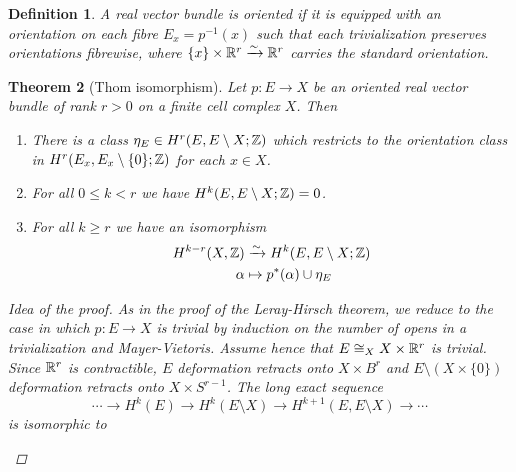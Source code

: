 \documentclass[A4paper, british, reqno]{amsart}
\theoremstyle{darkgreentheorem}
\newtheorem{thm}{Theorem}[section]
\theoremstyle{darkbluedefinition}
\newtheorem{defn}[thm]{Definition}
\theoremstyle{darkredexample}
\theoremstyle{remark}
\newcommand{\1}{\mathbbm{1}}
\newcommand{\ot}{\otimes}
\newcommand{\op}{\oplus}
\newcommand{\tms}{\times}
\begin{document}
\begin{defn}
    A real vector bundle is \textit{oriented} if it is equipped with an orientation on each fibre $E_{x}=p^{-1}(x)$ such that each trivialization preserves orientations fibrewise, where $\{x\}\times \mathbb{R}^{r}\xrightarrow{\sim}\mathbb{R}^{r}$ carries the standard orientation.
\end{defn}

\begin{thm}[Thom isomorphism]
    Let $p\colon E\to X$ be an oriented real vector bundle of rank $r>0$ on a finite cell complex $X$.
    Then
    \begin{enumerate}
	\item There is a class $\eta_{E}\in H^{r}(E,E\setminus X;\mathbb{Z})$ which restricts to the orientation class in $H^{r}(E_{x},E_{x}\setminus \{0\};\mathbb{Z})$ for each $x\in X$.
	\item For all $0\leqslant k<r$ we have $H^{k}(E,E\setminus X;\mathbb{Z})=0$.
	\item For all $k\geqslant r$ we have an isomorphism
	    \begin{align*}
		H^{k-r}(X,\mathbb{Z}) & \xrightarrow{\sim} H^{k}(E,E\setminus X;\mathbb{Z}) \\
		\alpha & \mapsto p^{*}(\alpha)\cup \eta_{E}
	    \end{align*}
    \end{enumerate}
    \begin{proof}[Idea of the proof]
	As in the proof of the Leray-Hirsch theorem, we reduce to the case in which $p\colon E\to X$ is trivial by induction on the number of opens in a trivialization and Mayer-Vietoris.
	Assume hence that $E\cong_{X} X\times \mathbb{R}^{r}$ is trivial.
	Since $\mathbb{R}^{r}$ is contractible, $E$ deformation retracts onto $X\times B^{r}$ and $E\setminus (X\times \{ 0\})$ deformation retracts onto $X\times S^{r-1}$.
	The long exact sequence
	\[ \cdots \to H^{k}(E)\to H^{k}(E\setminus X)\to H^{k+1}(E,E\setminus X)\to \cdots \]
	is isomorphic to
	\begin{center}
	\end{center}
    \end{proof}
\end{thm}
\end{document}
